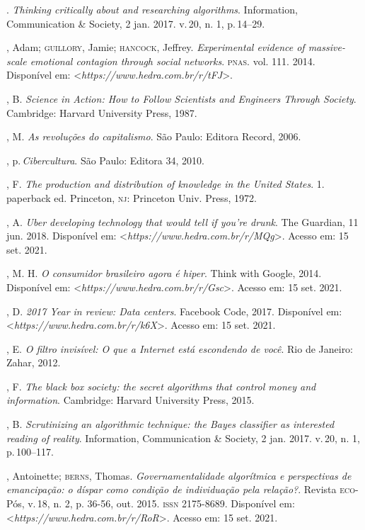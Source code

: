 \begin{bibliohedra}
\titidem. \emph{Thinking critically about and researching
algorithms}. Information, Communication \& Society, 2 jan. 2017. v.\,20,
n. 1, p.\,14--29.

, Adam; \textsc{guillory}, Jamie; \textsc{hancock}, Jeffrey. \emph{Experimental evidence of massive-scale emotional contagion through social networks}. \textsc{pnas}. vol.
111. 2014. Disponível em: \textless{}\emph{https://www.hedra.com.br/r/tFJ}\textgreater{}.

, B. \emph{Science in Action: How to Follow Scientists and
Engineers Through Society}. Cambridge: Harvard University Press, 1987.

, M. \emph{As revoluções do capitalismo}. São Paulo: Editora
Record, 2006.

, p.\,\emph{Cibercultura}. São Paulo: Editora 34, 2010.

, F. \emph{The production and distribution of knowledge in the
United States}. 1. paperback ed. Princeton, \textsc{nj}: Princeton Univ.
Press, 1972.

, A. \emph{Uber developing technology that would tell if you're
drunk}. The Guardian, 11 jun. 2018. Disponível em: \textless{}\emph{https://www.hedra.com.br/r/MQg}\textgreater{}.
Acesso em: 15 set. 2021.

, M. H. \emph{O consumidor brasileiro agora é hiper}. Think
with Google, 2014. Disponível em: \textless{}\emph{https://www.hedra.com.br/r/Gsc}\textgreater{}.
Acesso em: 15 set. 2021.

, D. \emph{2017 Year in review: Data centers}. Facebook Code,
2017. Disponível em: \textless{}\emph{https://www.hedra.com.br/r/k6X}\textgreater{}. Acesso em: 15 set. 2021.

, E. \emph{O filtro invisível: O que a Internet está escondendo
de você}. Rio de Janeiro: Zahar, 2012.

, F. \emph{The black box society: the secret algorithms that
control money and information}. Cambridge: Harvard University Press,
2015.

, B. \emph{Scrutinizing an algorithmic technique: the Bayes
classifier as interested reading of reality}. Information, Communication
\& Society, 2 jan. 2017. v.\,20, n. 1, p.\,100--117.

, Antoinette; \textsc{berns}, Thomas. \emph{Governamentalidade
algorítmica e perspectivas de emancipação: o díspar como condição de
individuação pela relação?}. Revista \textsc{eco}-Pós, v.\,18, n. 2, p.
36-56, out. 2015. \textsc{issn} 2175-8689. Disponível em:
\textless{}\emph{https://www.hedra.com.br/r/RoR}\textgreater{}. Acesso em: 15 set. 2021.


\end{bibliohedra}
